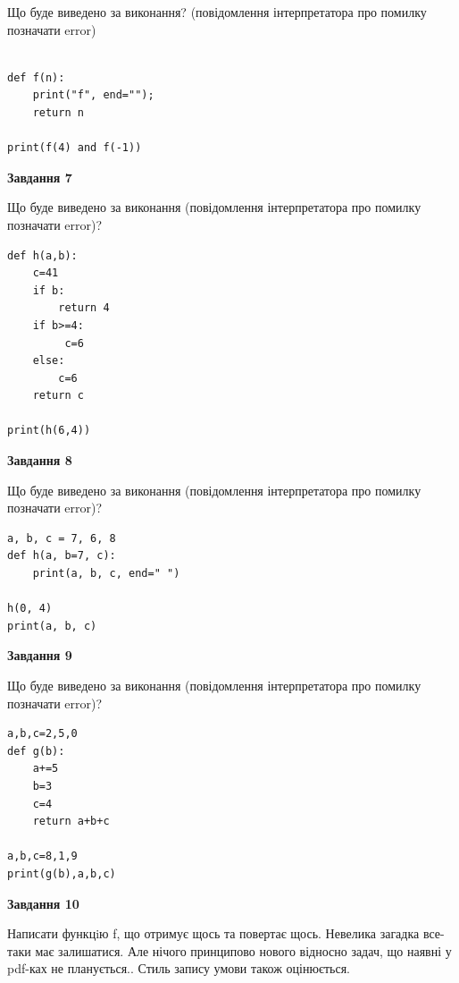\documentclass[12pt, ukrainian]{article}
\begin{document}
{\begin {large}
Що буде виведено за виконання? (повідомлення інтерпретатора про помилку позначати error)\par
\begin{verbatim}

def f(n):
    print("f", end="");
    return n

print(f(4) and f(-1))
\end{verbatim}

{\begin {center}\textbf{Завдання 7}\end {center}}

Що буде виведено за виконання (повідомлення інтерпретатора про помилку позначати error)?\par
\begin{verbatim}
def h(a,b):
    c=41
    if b:
        return 4
    if b>=4:
         c=6
    else: 
        c=6
    return c

print(h(6,4))
\end{verbatim}

{\begin {center}\textbf{Завдання 8}\end {center}}

Що буде виведено за виконання (повідомлення інтерпретатора про помилку позначати error)?\par
\begin{verbatim}
a, b, c = 7, 6, 8
def h(a, b=7, c):
    print(a, b, c, end=" ")

h(0, 4)
print(a, b, c)
\end{verbatim}

{\begin {center}\textbf{Завдання 9}\end {center}}

Що буде виведено за виконання (повідомлення інтерпретатора про помилку позначати error)?\par
\begin{verbatim}
a,b,c=2,5,0
def g(b):
    a+=5
    b=3
    c=4
    return a+b+c

a,b,c=8,1,9
print(g(b),a,b,c)
\end{verbatim}

{\begin {center}\textbf{Завдання 10}\end {center}}


Написати функцiю f, що отримує щось та повертає щось. Невелика загадка все-таки має залишатися. Але нічого принципово нового відносно задач, що наявні у pdf-ках не планується.. Стиль запису умови також оцінюється.\par
\end {large}}
\newpage
\end{document}
